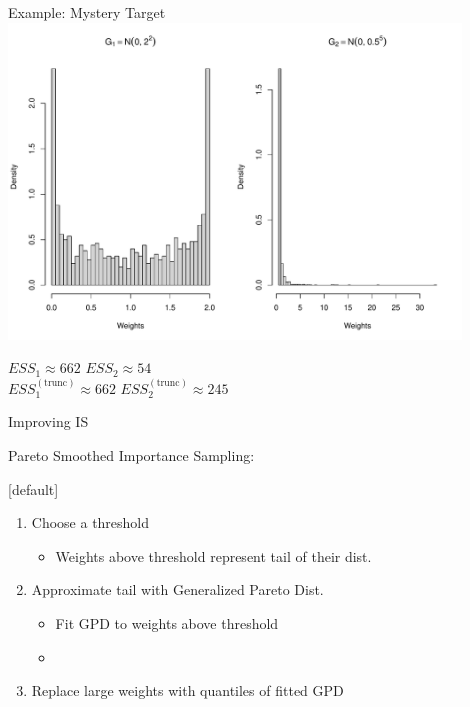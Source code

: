 \documentclass[14pt]{beamer}
\begin{document}

\begin{frame}{Example: Mystery Target}
    \centering
    \includegraphics[height=0.7\textheight, width=0.9\textwidth, keepaspectratio]{Figures/Wt Hist - Trunc.pdf} \newline
    \begin{outline}
        $ESS_1 \approx 662$ \hspace{2.5cm} $ESS_2 \approx 54$\\
        $ESS_1^{(\mathrm{trunc})} \approx 662$ \hspace{2.5cm} $ESS_2^{(\mathrm{trunc})} \approx 245$
    \end{outline}
\end{frame}


\begin{frame}{Improving IS}
    \begin{outline}
    \1 Pareto Smoothed Importance Sampling:
        \2 \citep{Veh24} \newline
    \end{outline}

    [default]
    \begin{enumerate}
    \item Choose a threshold
        \begin{itemize}
            \item Weights above threshold represent tail of their dist.
        \end{itemize}
    \item Approximate tail with Generalized Pareto Dist.
    \begin{itemize}
        \item Fit GPD to weights above threshold
        \item \citep{Zha09}
    \end{itemize}
    \item Replace large weights with quantiles of fitted GPD
    \end{enumerate}
\end{frame}
\end{document}

